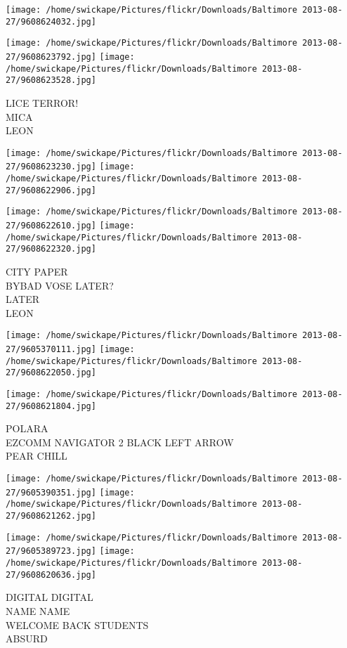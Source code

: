 \documentclass[10pt,letterpaper]{article}
\begin{document}
\texttt{[image: /home/swickape/Pictures/flickr/Downloads/Baltimore 2013-08-27/9608624032.jpg]}

\vspace{0.25in}
\texttt{[image: /home/swickape/Pictures/flickr/Downloads/Baltimore 2013-08-27/9608623792.jpg]}
\texttt{[image: /home/swickape/Pictures/flickr/Downloads/Baltimore 2013-08-27/9608623528.jpg]}

LICE TERROR!\\
MICA\\
LEON
\pagebreak

\texttt{[image: /home/swickape/Pictures/flickr/Downloads/Baltimore 2013-08-27/9608623230.jpg]}
\texttt{[image: /home/swickape/Pictures/flickr/Downloads/Baltimore 2013-08-27/9608622906.jpg]}

\texttt{[image: /home/swickape/Pictures/flickr/Downloads/Baltimore 2013-08-27/9608622610.jpg]}
\texttt{[image: /home/swickape/Pictures/flickr/Downloads/Baltimore 2013-08-27/9608622320.jpg]}

CITY PAPER\\
BYBAD VOSE LATER?\\
LATER\\
LEON
\pagebreak

\texttt{[image: /home/swickape/Pictures/flickr/Downloads/Baltimore 2013-08-27/9605370111.jpg]}
\texttt{[image: /home/swickape/Pictures/flickr/Downloads/Baltimore 2013-08-27/9608622050.jpg]}

\vspace{0.25in}
\texttt{[image: /home/swickape/Pictures/flickr/Downloads/Baltimore 2013-08-27/9608621804.jpg]}

POLARA\\
EZCOMM NAVIGATOR 2 BLACK LEFT ARROW\\
PEAR CHILL
\pagebreak

\texttt{[image: /home/swickape/Pictures/flickr/Downloads/Baltimore 2013-08-27/9605390351.jpg]}
\texttt{[image: /home/swickape/Pictures/flickr/Downloads/Baltimore 2013-08-27/9608621262.jpg]}

\texttt{[image: /home/swickape/Pictures/flickr/Downloads/Baltimore 2013-08-27/9605389723.jpg]}
\texttt{[image: /home/swickape/Pictures/flickr/Downloads/Baltimore 2013-08-27/9608620636.jpg]}

DIGITAL DIGITAL\\
NAME NAME\\
WELCOME BACK STUDENTS\\
ABSURD
\pagebreak
\end{document}
